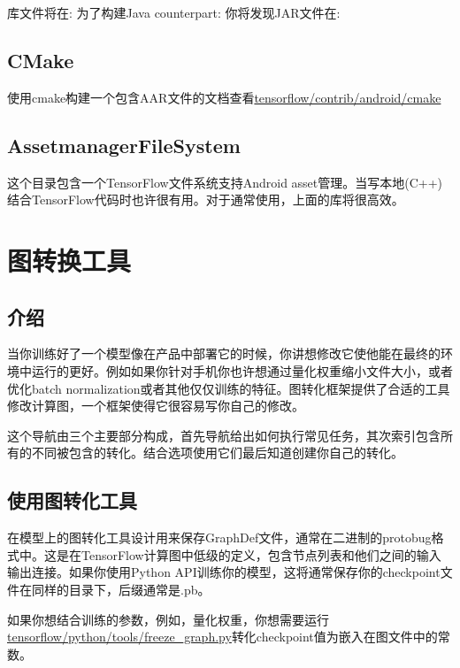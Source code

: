 库文件将在:\newline
{}\newline
为了构建Java counterpart:\newline 
{}\newline
你将发现JAR文件在:\newline
{}
\subsection{CMake}
使用cmake构建一个包含AAR文件的文档查看\href{https://github.com/tensorflow/tensorflow/blob/master/tensorflow/contrib/android/cmake}{tensorflow/contrib/android/cmake}
\subsection{AssetmanagerFileSystem}
这个目录包含一个TensorFlow文件系统支持Android asset管理。当写本地(C++)结合TensorFlow代码时也许很有用。对于通常使用，上面的库将很高效。
\section{图转换工具}
\subsection{介绍}
当你训练好了一个模型像在产品中部署它的时候，你讲想修改它使他能在最终的环境中运行的更好。例如如果你针对手机你也许想通过量化权重缩小文件大小，或者优化batch normalization或者其他仅仅训练的特征。图转化框架提供了合适的工具修改计算图，一个框架使得它很容易写你自己的修改。

这个导航由三个主要部分构成，首先导航给出如何执行常见任务，其次索引包含所有的不同被包含的转化。结合选项使用它们最后知道创建你自己的转化。
\subsection{使用图转化工具}
在模型上的图转化工具设计用来保存GraphDef文件，通常在二进制的protobug格式中。这是在TensorFlow计算图中低级的定义，包含节点列表和他们之间的输入输出连接。如果你使用Python API训练你的模型，这将通常保存你的checkpoint文件在同样的目录下，后缀通常是.pb。

如果你想结合训练的参数，例如，量化权重，你想需要运行\href{https://github.com/tensorflow/tensorflow/blob/master/tensorflow/python/tools/freeze_graph.py}{tensorflow/python/tools/freeze\_graph.py}转化checkpoint值为嵌入在图文件中的常数。

